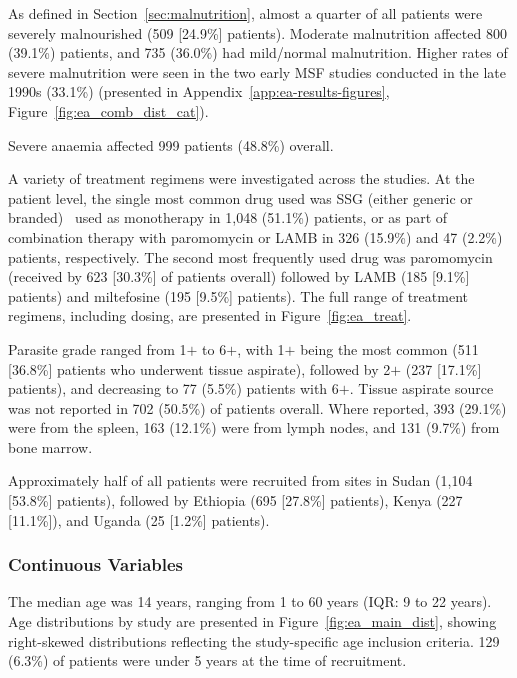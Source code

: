 As defined in Section~\ref{sec:malnutrition}, almost a quarter of all patients were severely malnourished (509 [24.9\%] patients). Moderate malnutrition affected 800 (39.1\%) patients, and 735 (36.0\%) had mild/normal malnutrition. Higher rates of severe malnutrition were seen in the two early MSF studies conducted in the late 1990s (33.1\%)\cite{veeken2000,ritmeijer2001} (presented in Appendix~\ref{app:ea-results-figures}, Figure~\ref{fig:ea_comb_dist_cat}).

Severe anaemia affected 999 patients (48.8\%) overall.

A variety of treatment regimens were investigated across the studies. At the patient level, the single most common drug used was SSG (either generic or branded) \textemdash\ used as monotherapy in 1,048 (51.1\%) patients, or as part of combination therapy with paromomycin or LAMB in 326 (15.9\%) and 47 (2.2\%) patients, respectively. The second most frequently used drug was paromomycin (received by 623 [30.3\%] of patients overall) followed by LAMB (185 [9.1\%] patients) and miltefosine (195 [9.5\%] patients). The full range of treatment regimens, including dosing, are presented in Figure~\ref{fig:ea_treat}.

Parasite grade ranged from 1$+$ to 6$+$, with 1$+$ being the most common (511 [36.8\%] patients who underwent tissue aspirate), followed by 2$+$ (237 [17.1\%] patients), and decreasing to 77 (5.5\%) patients with 6$+$. Tissue aspirate source was not reported in 702 (50.5\%) of patients overall. Where reported, 393 (29.1\%) were from the spleen, 163 (12.1\%) were from lymph nodes, and 131 (9.7\%) from bone marrow.

Approximately half of all patients were recruited from sites in Sudan (1,104 [53.8\%] patients), followed by Ethiopia (695 [27.8\%] patients), Kenya (227 [11.1\%]), and Uganda (25 [1.2\%] patients).



\subsubsection{Continuous Variables}

The median age was 14 years, ranging from 1 to 60 years (IQR: 9 to 22 years). Age distributions by study are presented in Figure~\ref{fig:ea_main_dist}, showing right-skewed distributions reflecting the study-specific age inclusion criteria. 129 (6.3\%) of patients were under 5 years at the time of recruitment.

